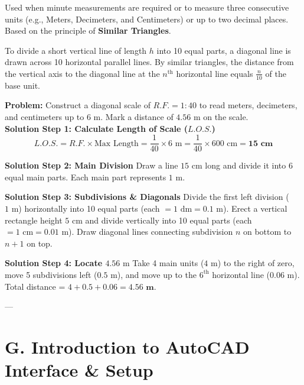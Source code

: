 \begin{definition}
Used when minute measurements are required or to measure three consecutive units (e.g., Meters, Decimeters, and Centimeters) or up to two decimal places. Based on the principle of \textbf{Similar Triangles}.
\end{definition}

\begin{importantrule}
To divide a short vertical line of length $h$ into 10 equal parts, a diagonal line is drawn across 10 horizontal parallel lines. By similar triangles, the distance from the vertical axis to the diagonal line at the $n^{\text{th}}$ horizontal line equals $\frac{n}{10}$ of the base unit.
\end{importantrule}

\begin{example}
\textbf{Problem:} Construct a diagonal scale of $R.F. = 1:40$ to read meters, decimeters, and centimeters up to $6\text{ m}$. Mark a distance of $4.56\text{ m}$ on the scale.\\[4pt]
\textbf{Solution Step 1: Calculate Length of Scale ($L.O.S.$)}
\begin{equation*}
    L.O.S. = R.F. \times \text{Max Length} = \frac{1}{40} \times 6\text{ m} = \frac{1}{40} \times 600\text{ cm} = \mathbf{15\text{ cm}}
\end{equation*}

\noindent \textbf{Solution Step 2: Main Division}
Draw a line $15\text{ cm}$ long and divide it into 6 equal main parts. Each main part represents $1\text{ m}$.

\noindent \textbf{Solution Step 3: Subdivisions \& Diagonals}
Divide the first left division ($1\text{ m}$) horizontally into 10 equal parts (each $= 1\text{ dm} = 0.1\text{ m}$). Erect a vertical rectangle height $5\text{ cm}$ and divide vertically into 10 equal parts (each $= 1\text{ cm} = 0.01\text{ m}$). Draw diagonal lines connecting subdivision $n$ on bottom to $n+1$ on top.

\noindent \textbf{Solution Step 4: Locate $4.56\text{ m}$}
Take 4 main units ($4\text{ m}$) to the right of zero, move 5 subdivisions left ($0.5\text{ m}$), and move up to the $6^{\text{th}}$ horizontal line ($0.06\text{ m}$). Total distance = $4 + 0.5 + 0.06 = \mathbf{4.56\text{ m}}$.
\end{example}

---

\section{G. Introduction to AutoCAD Interface \& Setup}

